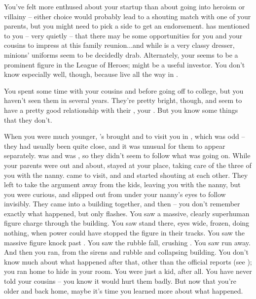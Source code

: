 \documentclass[char]{LRSguildcamp1}
\begin{document}
You've felt more enthused about your startup than about going into heroism or villainy -- either choice would probably lead to a shouting match with one of your parents, but you might need to pick a side to get an endorsement.  \cGrandma{} has mentioned to you -- very quietly -- that there may be some opportunities for you and your cousins to impress \cGrandma{\them} at this family reunion...and while \cGrandma{} \cGrandma{\themself} is a very classy dresser, \cGrandma{\their} minions' uniforms seem to be decidedly drab.  Alternately, your \cYoungest{\uncle} \cYoungest{} seems to be a prominent figure in the League of Heroes; \cYoungest{\they} might be a useful investor.  You don't know \cYoungest{\them} especially well, though, because \cYoungest{\they} live all the way in \pCityYoungest{}.

You spent some time with your cousins \cTeen{} and \cTween{} before going off to college, but you haven't seen them in several years.  They're pretty bright, though, and seem to have a pretty good relationship with their \cArchitect{\parent}, your \cArchitect{\uncle} \cArchitect{}.  But you know some things that they don't.

When you were much younger, \cArchitect{}'s \cAS{\spouse} \cAS{} brought \cTeen{} and \cTween{} to visit you in \pCityO{}, which was odd -- they had usually been quite close, and it was unusual for them to appear separately.  \cTeen{} was  and \cTween{} was , so they didn't seem to follow what was going on.  While your parents were out and about, \cAS{} stayed at your place, taking care of the three of you with the nanny.  \cArchitect{} came to visit, and \cArchitect{\they} and \cAS{} started shouting at each other.  They left to take the argument away from the kids, leaving you with the nanny, but you were curious, and slipped out from under your nanny's eyes to follow invisibly.  They came into a building  together, and then -- you don't remember exactly what happened, but only flashes.  You saw a massive, clearly superhuman figure charge through the building.  You saw \cArchitect{} stand there, eyes wide, frozen, doing nothing, when \cArchitect{\their} power could have stopped the figure in their tracks. You saw the massive figure knock past \cAS{}.  You saw the rubble fall, crushing \cAS{}.  You saw \cArchitect{} run away.  And then you ran, from the sirens and rubble and collapsing building.  You don't know much about what happened after that, other than the official reports (see \bChicagoIncident{}); you ran home to hide in your room.  You were just a kid, after all.
  You have never told your cousins -- you know it would hurt them badly.  But now that you're older and back home, maybe it's time you learned more about what happened. 
\end{document}
